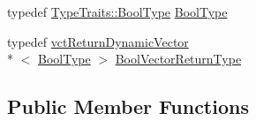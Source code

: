\begin{DoxyCompactItemize}
\item 
typedef \hyperlink{classcmn_type_traits_aaa41087228a7f165bcd9f4385e644e28}{Type\-Traits\-::\-Bool\-Type} \hyperlink{classvct_dynamic_const_vector_base_a4b96efa633976c8be7648bb4ec0392a7}{Bool\-Type}
\item 
typedef \hyperlink{classvct_return_dynamic_vector}{vct\-Return\-Dynamic\-Vector}\\*
$<$ \hyperlink{classvct_dynamic_const_vector_base_a4b96efa633976c8be7648bb4ec0392a7}{Bool\-Type} $>$ \hyperlink{classvct_dynamic_const_vector_base_a2de5b9c0f8c70782c548808d3ae4a453}{Bool\-Vector\-Return\-Type}
\end{DoxyCompactItemize}
\subsection*{Public Member Functions}

